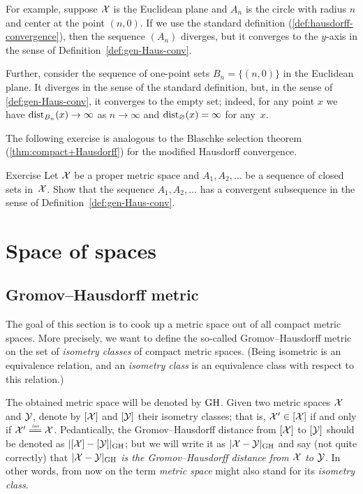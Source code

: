 For example, suppose $\mathcal{X}$ is the Euclidean plane and $A_n$ is the circle with radius $n$ and center at the point $(n,0)$.
If we use the standard definition (\ref{def:hausdorff-convergence}), then the sequence $(A_n)$ diverges, but it converges to the $y$-axis in the sense of Definition~\ref{def:gen-Haus-conv}.

Further, consider the sequence of one-point sets $B_n=\{(n,0)\}$ in the Euclidean plane.
It diverges in the sense of the standard definition, but, in the sense of \ref{def:gen-Haus-conv}, it converges to the empty set;
indeed, for any point $x$ we have $\mathrm{dist}_{B_n}(x)\to\infty$ as $n\to \infty$ and $\mathrm{dist}_{\varnothing}(x)= \infty$ for any~$x$.

The following exercise is analogous to the Blaschke selection theorem (\ref{thm:compact+Hausdorff}) for the modified Hausdorff convergence.

\begin{thm}{Exercise}\label{ex:generalized-selection}
Let $\mathcal{X}$ be a proper metric space
and $A_1,A_2,\dots$ be a sequence of closed sets in~$\mathcal{X}$.
Show that the sequence  $A_1,A_2,\dots$ has a convergent subsequence in the sense of Definition~\ref{def:gen-Haus-conv}.
\end{thm}

\chapter{Space of spaces}

\section{Gromov--Hausdorff metric}

The goal of this section is to cook up a metric space out of all compact metric spaces.
More precisely, we want to define the so-called  Gromov--Hausdorff metric on the set of \textit{isometry classes} of compact metric spaces.
(Being isometric is an equivalence relation, 
and an \emph{isometry class} is an equivalence class with respect to this relation.)

The obtained metric space will be denoted by $\operatorname{\rm GH}\nolimits$.
Given two metric spaces $\mathcal{X}$ and $\mathcal{Y}$,
denote by $[\mathcal{X}]$ and $[\mathcal{Y}]$ their isometry classes;
that is, $\mathcal{X}'\in [\mathcal{X}]$ if and only if $\spc{X}'\iso \spc{X}$.
Pedantically, the Gromov--Hausdorff distance from $[\mathcal{X}]$ 
to $[\mathcal{Y}]$ should be denoted as $|[\mathcal{X}]-[\mathcal{Y}]|_{\operatorname{\rm GH}\nolimits}$;
but we will write it as $|\spc{X}\z-\spc{Y}|_{\GH}$ and say (not quite correctly) that 
\textit{$|\spc{X}\z-\spc{Y}|_{\GH}$ is the Gromov--Hausdorff distance from  $\mathcal{X}$ 
to  $\mathcal{Y}$}.
In other words, from now on the term \textit{metric space} might also stand for its \textit{isometry class}.

